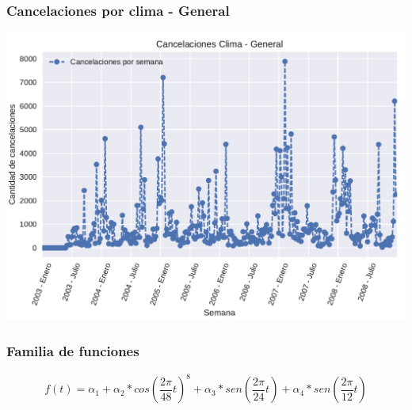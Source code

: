 \documentclass{beamer}
\begin{document}
\begin{frame}



\frametitle{Cancelaciones por clima - General}

{\centering
\includegraphics[scale=0.62]{diapos/imagenes/cancelacionesClimaGeneralPlotV1.pdf}
}

\end{frame}



\begin{frame}



\frametitle{Familia de funciones}

\pause

$$f(t) = \alpha_1 + \alpha_2 * cos(\frac{2\pi}{48} t)^{8} + \alpha_3 * sen(\frac{2\pi}{24} t) + \alpha_4 * sen(\frac{2\pi}{12} t)$$

\end{frame}
\end{document}
